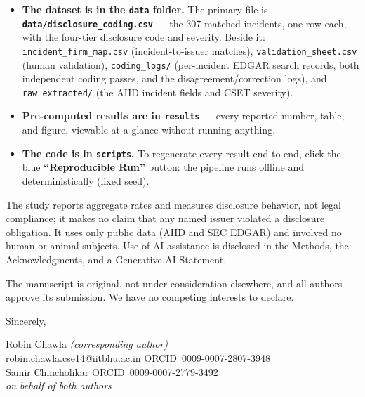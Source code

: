 \documentclass[11pt]{article}
\begin{document}
\begin{itemize}\setlength{\itemsep}{1pt}\setlength{\parskip}{0pt}\setlength{\topsep}{2pt}
\item \textbf{The dataset is in the \texttt{data} folder.} The primary file is \textbf{\texttt{data/disclosure\_coding.csv}} --- the 307 matched incidents, one row each, with the four-tier disclosure code and severity. Beside it: \texttt{incident\_firm\_map.csv} (incident-to-issuer matches), \texttt{validation\_sheet.csv} (human validation), \texttt{coding\_logs/} (per-incident EDGAR search records, both independent coding passes, and the disagreement/correction logs), and \texttt{raw\_extracted/} (the AIID incident fields and CSET severity).
\item \textbf{Pre-computed results are in \texttt{results}} --- every reported number, table, and figure, viewable at a glance without running anything.
\item \textbf{The code is in \texttt{scripts}.} To regenerate every result end to end, click the blue \textbf{``Reproducible Run''} button: the pipeline runs offline and deterministically (fixed seed).
\end{itemize}

The study reports aggregate rates and measures disclosure behavior, not legal compliance; it makes no claim that any named issuer violated a disclosure obligation. It uses only public data (AIID and SEC EDGAR) and involved no human or animal subjects. Use of AI assistance is disclosed in the Methods, the Acknowledgments, and a Generative AI Statement.

The manuscript is original, not under consideration elsewhere, and all authors approve its submission. We have no competing interests to declare.

\vspace{6pt}
Sincerely,

\begingroup\raggedright
Robin Chawla \emph{(corresponding author)}\\
\href{mailto:robin.chawla.cse14@iitbhu.ac.in}{robin.chawla.cse14@iitbhu.ac.in} \quad ORCID~\mbox{\href{https://orcid.org/0009-0007-2807-3948}{0009-0007-2807-3948}}\\[3pt]
Samir Chincholikar \quad ORCID~\mbox{\href{https://orcid.org/0009-0007-2779-3492}{0009-0007-2779-3492}}\\[3pt]
\emph{on behalf of both authors}
\par\endgroup
\end{document}
